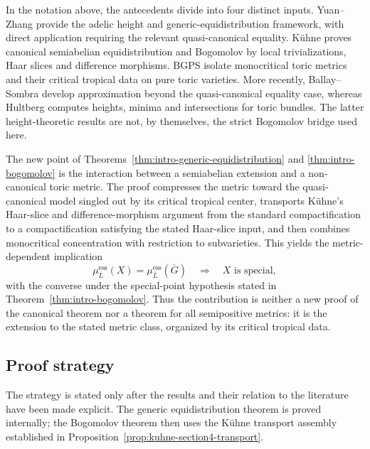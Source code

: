 \documentclass[10pt,a4paper]{amsart}
\theoremstyle{plain}
\theoremstyle{plain}
\numberwithin{equation}{section}
\begin{document}
In the notation above, the antecedents divide into four distinct inputs.
Yuan--Zhang \cite{YZ} provide the adelic height and generic-equidistribution
framework, with direct application requiring the relevant quasi-canonical
equality.  K\"uhne \cite{Ku1} proves canonical semiabelian equidistribution
and Bogomolov by local trivializations, Haar slices and difference morphisms.
BGPS \cite{BGPS19} isolate monocritical toric metrics and their critical
tropical data on pure toric varieties.  More recently, Ballay--Sombra
\cite{BS24} develop approximation beyond the quasi-canonical equality case,
whereas Hultberg \cite{Hul24} computes heights, minima and intersections for
toric bundles.  The latter height-theoretic results are not, by themselves,
the strict Bogomolov bridge used here.

The new point of Theorems~\ref{thm:intro-generic-equidistribution} and
\ref{thm:intro-bogomolov} is the interaction between a semiabelian extension
and a non-canonical toric metric.  The proof compresses the metric toward the
quasi-canonical model singled out by its critical tropical center, transports
K\"uhne's Haar-slice and difference-morphism argument from the standard
compactification to a compactification satisfying the stated Haar-slice input,
and
then combines monocritical concentration with restriction to subvarieties.
This yields the metric-dependent implication
\[
\mu^{\mathrm{ess}}_{\overline L}(X)
=\mu^{\mathrm{ess}}_{\overline L}(\overline G)
\quad\Longrightarrow\quad X\text{ is special},
\]
with the converse under the special-point hypothesis stated in
Theorem~\ref{thm:intro-bogomolov}.  Thus the contribution is neither a new
proof of the canonical theorem nor a theorem for all semipositive metrics: it
is the extension to the stated metric class, organized by its critical
tropical data.


\subsection*{Proof strategy}

The strategy is stated only after the results and their relation to the
literature have been made explicit.  The generic equidistribution theorem is
proved internally; the Bogomolov theorem then uses the K\"uhne transport
assembly established in Proposition~\ref{prop:kuhne-section4-transport}.
\end{document}
